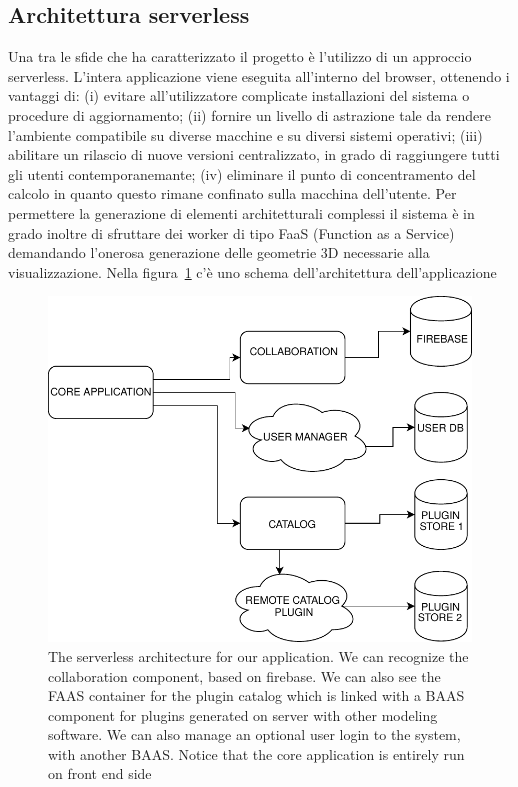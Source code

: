 \subsection{Architettura serverless}
Una tra le sfide che ha caratterizzato il progetto \`e l'utilizzo di un approccio serverless. L'intera applicazione viene eseguita all'interno del browser, ottenendo i vantaggi di: (i) evitare all'utilizzatore complicate installazioni del sistema o procedure di aggiornamento; (ii) fornire un livello di astrazione tale da rendere l'ambiente compatibile su diverse macchine e su diversi sistemi operativi; (iii) abilitare un rilascio di nuove versioni centralizzato, in grado di raggiungere tutti gli utenti contemporanemante; (iv) eliminare il punto di concentramento del calcolo in quanto questo rimane confinato sulla macchina dell'utente.
Per permettere la generazione di elementi architetturali complessi il sistema \`e in grado inoltre di sfruttare dei worker di tipo FaaS (Function as a Service) demandando l'onerosa generazione delle geometrie 3D necessarie alla visualizzazione. Nella figura~\ref{fig_serverless} c'\`e uno schema dell'architettura dell'applicazione
\begin{figure}[htb]
\centering
\includegraphics[width=\linewidth]{contents/images/serverless-diagram}

\caption{The serverless architecture for our application. We can recognize the collaboration component, based on firebase. We can also see the FAAS container for the plugin catalog which is linked with a BAAS component for plugins generated on server with other modeling software. We can also manage an optional user login to the system, with another BAAS. Notice that the core application is entirely run on front end side}
\label{fig_serverless}
\end{figure}